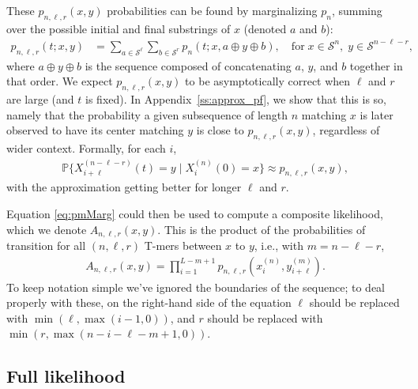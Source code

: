 \documentclass{article}
\renewcommand{\P}{\mathbb{P}}
\newcommand{\calS}{\mathcal{S}}  %
\newcommand{\join}{\oplus}  %
\theoremstyle{plain}
\theoremstyle{definition}
\begin{document}
These $p_{n,\ell,r}(x,y)$ probabilities can be found by marginalizing $p_n$,
summing over the possible initial and final substrings of $x$
(denoted $a$ and $b$):
\begin{align}
    p_{n,\ell,r}(t;x,y)
    &=
    \sum_{a \in \calS^\ell} \sum_{b \in \calS^r} p_n(t;x,a \join y \join b) ,
    \quad
    \text{for}\; x \in \calS^n, \; y \in \calS^{n-\ell-r} ,
    \label{eq:pmMarg}
\end{align}
where $a \join y \join b$ is the sequence composed of concatenating $a$, $y$, and $b$ together in that order.
We expect $p_{n,\ell,r}(x,y)$ to be asymptotically correct when $\ell$ and $r$ are large (and $t$ is fixed).
In Appendix~\ref{ss:approx_pf}, we show that this is so, namely that
the probability a given subsequence of length $n$ matching $x$
is later observed to have its center matching $y$
is close to $p_{n,\ell,r}(x,y)$, regardless of wider context.
Formally, for each $i$,
\begin{align} \label{eqn:window_approx}
    \P\{ X_{i+\ell}^{(n-\ell-r)}(t) = y \mid X_i^{(n)}(0) = x \}
    \approx
    p_{n,\ell,r}(x,y)
    ,
\end{align}
with the approximation getting better for longer $\ell$ and $r$.

Equation \eqref{eq:pmMarg} could then be used to compute a composite likelihood,
which we denote $A_{n, \ell, r}(x,y)$.
This is the product of the probabilities
of transition for all $(n, \ell, r)$ T-mers between $x$ to $y$, i.e.,
with $m = n - \ell - r$,
\begin{align}\label{eqn:composite_like}
    A_{n, \ell, r}(x,y)
        =
        \prod_{i=1}^{L-m+1} p_{n, \ell, r}\left(x_i^{(n)}, y_{i+\ell}^{(m)}\right).
\end{align}
To keep notation simple we've ignored the boundaries of the sequence;
to deal properly with these,
on the right-hand side of the equation $\ell$ should be replaced with $\min(\ell, \max(i-1, 0))$,
and $r$ should be replaced with $\min(r, \max(n-i-\ell-m+1, 0))$.


\subsection{Full likelihood}
\end{document}
